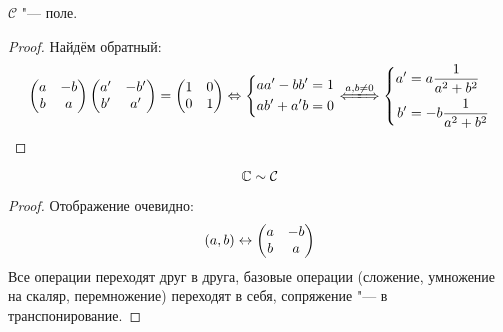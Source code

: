 \begin{assertion}
$\mathcal{C}$ "--- поле.
\end{assertion}
\begin{proof}
Найдём обратный:
$$\left(\begin{matrix}a & -b \\ b & a\end{matrix}\right)\left(\begin{matrix}a' & -b' \\ b' & a'\end{matrix}\right) = \left(\begin{matrix}1 & 0 \\ 0 & 1\end{matrix}\right) 
\Lra \left\{\begin{aligned}aa'-bb' &= 1 \\ ab'+a'b &= 0\end{aligned}\right.\xLongleftrightarrow{a, b \ne 0} \left\{\begin{aligned}a' &= a\frac1{a^2+b^2} \\ b' &= -b\frac1{a^2+b^2}\end{aligned}\right.$$
\end{proof}

\begin{assertion}
$$\mathbb{C} \sim \mathcal{C}$$
\end{assertion}
\begin{proof}
Отображение очевидно:
$$(a, b) \leftrightarrow \left(\begin{matrix}a & -b \\ b & a\end{matrix}\right)$$
Все операции переходят друг в друга, базовые операции (сложение, умножение на скаляр, перемножение) переходят в себя, сопряжение "--- в транспонирование.
\end{proof}
